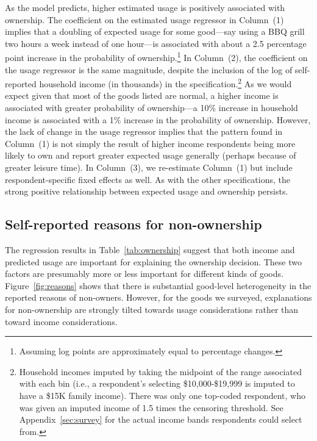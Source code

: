 \documentclass[11pt]{article}
\begin{document}
As the model predicts, higher estimated usage is positively associated with ownership.
The coefficient on the estimated usage regressor in Column~(1) implies that a doubling of expected usage for some good---say using a BBQ grill two hours a week instead of one hour---is associated with about a 2.5 percentage point increase in the probability of ownership.\footnote{Assuming log points are approximately equal to percentage changes.} 
In Column~(2), the coefficient on the usage regressor is the same magnitude, despite the inclusion of the log of self-reported household income (in thousands) in the specification.\footnote{
  Household incomes imputed by taking the midpoint of the range associated with each bin (i.e., a respondent's selecting \$10,000-\$19,999 is imputed to have a \$15K family income).
  There was only one top-coded respondent, who was given an imputed income of 1.5 times the censoring threshold.
  See Appendix~\ref{sec:survey} for the actual income bands respondents could select from.
  }
As we would expect given that most of the goods listed are normal, a higher income is associated with greater probability of ownership---a 10\% increase in household income is associated with a 1\% increase in the probability of ownership.  
However, the lack of change in the usage regressor implies that the pattern found in Column~(1) is not simply the result of higher income respondents being more likely to own and report greater expected usage generally (perhaps because of greater leisure time). 
In Column~(3), we re-estimate Column~(1) but include respondent-specific fixed effects as well.
As with the other specifications, the strong positive relationship between expected usage and ownership persists. 

\subsection{Self-reported reasons for non-ownership}

The regression results in Table~\ref{tab:ownership} suggest that both income and predicted usage are important for explaining the ownership decision. 
These two factors are presumably more or less important for different kinds of goods.
Figure~\ref{fig:reasons} shows that there is substantial good-level heterogeneity in the reported reasons of non-owners.
However, for the goods we surveyed, explanations for non-ownership are strongly tilted towards usage considerations rather than toward income considerations.
\end{document}
